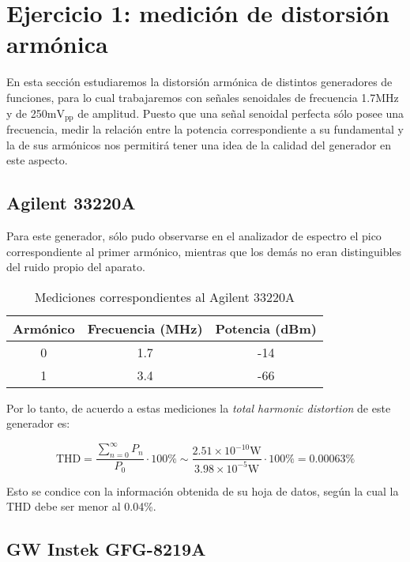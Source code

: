 \documentclass[../../labo_tp5_main.tex]{subfiles}
\begin{document}
\section{Ejercicio 1: medici\'on de distorsi\'on arm\'onica}

En esta secci\'on estudiaremos la distorsi\'on arm\'onica de distintos generadores de funciones, para lo cual trabajaremos con se\~nales senoidales de frecuencia 1.7MHz y de 250m$\mathrm{V}_{\mathrm{pp}}$ de amplitud. Puesto que una se\~nal senoidal perfecta s\'olo posee una frecuencia, medir la relaci\'on entre la potencia correspondiente a su fundamental y la de sus arm\'onicos nos permitir\'a tener una idea de la calidad del generador en este aspecto.

\subsection{Agilent 33220A} 

Para este generador, s\'olo pudo observarse en el analizador de espectro el pico correspondiente al primer arm\'onico, mientras que los dem\'as no eran distinguibles del ruido propio del aparato.

\begin{table}[H]
	\centering
	\begin{tabular}{|c|c|c|}
	\hline
	Arm\'onico		& Frecuencia (MHz)	& Potencia (dBm)	\\ \hline \hline 
	0			& 1.7				& -14			\\ \hline
	1			& 3.4				& -66			\\ \hline	
	\end{tabular}
	\caption{Mediciones correspondientes al Agilent 33220A}
\end{table}

Por lo tanto, de acuerdo a estas mediciones la \textit{total harmonic distortion} de este generador es:

\begin{equation}
	\mathrm{THD} = \frac{\sum_{n=0}^\infty P_n}{P_0} \cdot 100\% \sim \frac{2.51\times 10^{-10}\mathrm{W}}{3.98\times 10^{-5}\mathrm{W}} \cdot 100\% = 0.00063\%
\end{equation}

Esto se condice con la informaci\'on obtenida de su hoja de datos, seg\'un la cual la THD debe ser menor al 0.04\%.

\subsection{GW Instek GFG-8219A}
\end{document}
